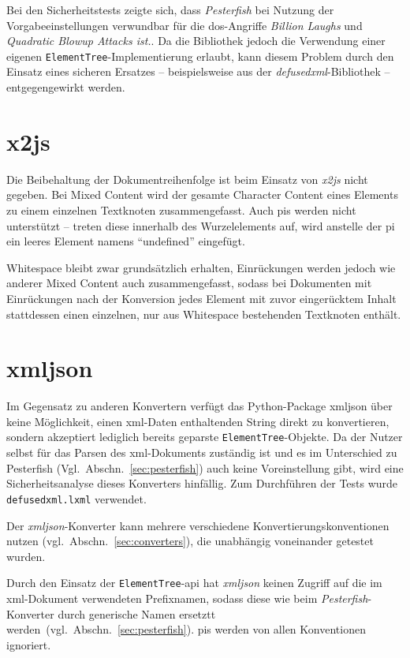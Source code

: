 Bei den Sicherheitstests zeigte sich, dass \emph{Pesterfish} bei Nutzung der Vorgabeeinstellungen verwundbar für die \acrshort{dos}-Angriffe \emph{Billion Laughs} und \emph{Quadratic Blowup Attacks ist.}. Da die Bibliothek jedoch die Verwendung einer eigenen \texttt{ElementTree}-Implementierung erlaubt, kann diesem Problem durch den Einsatz eines sicheren Ersatzes -- beispielsweise aus der \emph{defusedxml}-Bibliothek -- entgegengewirkt werden.

\section{x2js}
\label{sec:x2js}

Die Beibehaltung der Dokumentreihenfolge ist beim Einsatz von \emph{x2js} nicht gegeben. Bei Mixed Content wird der gesamte Character Content eines Elements zu einem einzelnen Textknoten zusammengefasst. Auch \glspl{pi} werden nicht unterstützt -- treten diese innerhalb des Wurzelelements auf, wird anstelle der \gls{pi} ein leeres Element namens \enquote{undefined} eingefügt.

Whitespace bleibt zwar grundsätzlich erhalten, Einrückungen werden jedoch wie anderer Mixed Content auch zusammengefasst, sodass bei Dokumenten mit Einrückungen nach der Konversion jedes Element mit zuvor eingerücktem Inhalt stattdessen einen einzelnen, nur aus Whitespace bestehenden Textknoten enthält.

\section{xmljson}
\label{sec:xmljson}

Im Gegensatz zu anderen Konvertern verfügt das Python-Package xmljson über keine Möglichkeit, einen \acrshort{xml}-Daten enthaltenden String direkt zu konvertieren, sondern akzeptiert lediglich bereits geparste \texttt{ElementTree}-Objekte. Da der Nutzer selbst für das Parsen des \acrshort{xml}-Dokuments zuständig ist und es im Unterschied zu Pesterfish (Vgl.~Abschn.~\ref{sec:pesterfish}) auch keine Voreinstellung gibt, wird eine Sicherheitsanalyse dieses Konverters hinfällig. Zum Durchführen der Tests wurde \texttt{defusedxml.lxml} verwendet.

Der \emph{xmljson}-Konverter kann mehrere verschiedene Konvertierungskonventionen nutzen (vgl.~Abschn.~\ref{sec:converters}), die unabhängig voneinander getestet wurden.

Durch den Einsatz der \texttt{ElementTree}-\acrshort{api} hat \emph{xmljson} keinen Zugriff auf die im \acrshort{xml}-Dokument verwendeten Prefixnamen, sodass diese wie beim \emph{Pesterfish}-Konverter durch generische Namen ersetztt werden~(vgl.~Abschn.~\ref{sec:pesterfish}).
\glspl{pi} werden von allen Konventionen ignoriert.

